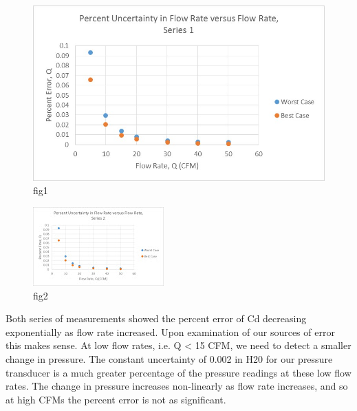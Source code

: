 \documentclass{article}
\begin{document}
  \begin{figure}[!htb]
   \begin{center}
    \includegraphics[width = 12 cm]{figs/PercentUncertaintyQVsQ_Series1.jpg}
    \caption{fig1}
    \label{orif-s1}
   \end{center}
  \end{figure}

  \begin{figure}[!htb]
   \begin{center}
    \includegraphics[width = 12 cm]{figs/PercentUncertaintyQVsQ_Series2.jpg}
    \caption{fig2}
    \label{orif-s2}
   \end{center}
  \end{figure}

Both series of measurements showed the percent error of Cd decreasing exponentially as flow 
rate increased. Upon examination of our sources of error this makes sense. At low flow rates, i.e. Q < 15 
CFM, we need to detect a smaller change in pressure. The constant uncertainty of 0.002 in H20 for our 
pressure transducer is a much greater percentage of the pressure readings at these low flow rates. The 
change in pressure increases non-linearly as flow rate increases, and so at high CFMs the percent error is 
not as significant.
\end{document}
